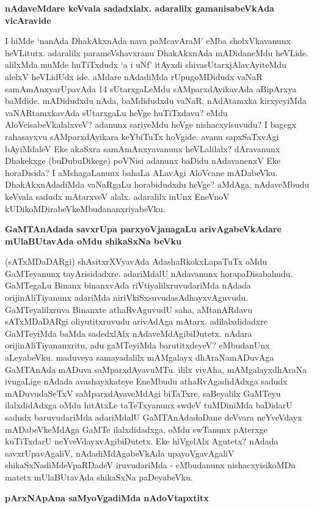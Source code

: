 {\bigskip
\noindent
{\large\bf nAdaveMdare keVvala sadadxlalx. adaralilx gamanisabeVkAda vicAravide}}\label{page169}
\medskip

\noindent
I hiMde `nanAda DhakAkxnAda nava paMcavAraM' eMba sholxVkavanunx heVLitutx. adaralilx parameVshavxranu DhakAkxnAda mADidaneMdu heVLide. alilxMda muMde huTiTxdudx `a i uNf' itAyxdi shivasUtarxjAlavAyi\-teMdu alelxV heVLidUdx ide. aMdare nAdadiMda rUpugoMDidudx vaNaR samAmAnxyarUpavAda 14 sUtarx\-gaLeMdu sAMparxdAyikavAda aBipArxya baMdide. mADidudxdu nAda, baMdidudxdu vaNaR. nAdA\-tamxka kirxyeyiMda vaNARtamxkavAda sUtarxgaLu heVge huTiTxdavu? eMdu AloVcisabeVkalalxveV? adanunx sari\-yeMdu heVge nishacxyisuvudu? I bagegx rahasayxvu sAMparxdAyikara keYbiTuTx hoVgide. avanu sapxSaTxvAgi bAyiM\-daleV Eke akaSxra samAmAnxyavanunx heVLalilalx? dAravanunx Dhakekxge (buDubuDikege) poVNisi adanunx baDidu nAdavanenxV Eke horaDisida? I aMshagaLanunx bahaLa ALavAgi AloVcane mADabeVku. DhakAkx\-nAdadiMda vaNaRgaLu horabidudxdu heVge? aMdAga, nAdaveMbudu keVvala sadudx mAtarxveV alalx. adaralilx inUnx EneVnoV kUDikoMDirabeVkeMbudananxriyabeVku.

{\bigskip
\noindent
{\large\bf GaMTAnAdada savxrUpa parxyoVjanagaLu arivAgabeVkAdare mUlaBUtavAda oMdu shikaSxNa beVku}}\label{page169}
\medskip

\noindent
(sATxMDaDARgi) shAsitxrXVyavAda AdashaRkokxLapaTuTx oMdu GaMTeyanunx tayArisi\-dadxre. adariM\-dalU nAdavanunx horapaDisabahudu. GaMTegaLu Binanx binanxvAda riVtiyalilxruvudariMda nAdada oriji\-nAliTi\-yanunx adariMda niriVkiSxsuvuda\-sAdhayxvAguvudu. GaMTeyalilxruva Binanxte athaRvAguvudU saha, aMtanARdavu sATxMDaDARgi oliyutitxruvudu arivAdAga mAtarx. adilalxdidadxre GaMTeyiMda baMda sadedxlAlx nAdaveMdAgibiDutetx. nAdara orijinAliTiyananxritu, adu gaMTeyiMda barutitxdeyeV? eMbu\-danUnx aLeyabeVku. maduveya samayadalilx mAMgalayx dhAraNamADuvAga GaMTAnAda mADuva saMparxdAyavuMTu. ililx vivAha, mAMgalayxdhAraNa ivugaLige nAdada avashayxkateye EneMbudu athaR\-vAgadidAdxga sadudx mADuvudaSeTxV saMparxdAyaveMdAgi biTaTxre, saBeyalilx GaMTeyu ilalxdidAdxga oMdu hitAtxLe taTeTxyanunx swdeV tuMDiniMda baDidarU sadudx baruvudariMda adariMdalU GaMTAnAda\-doDane deVvara neYveVdayx mADabeVkeMdAga GaMTe ilalxdidadxga, oMdu swTanunx pAterxge kuTiTxdarU neYveVdayxvAgi\-biDutetx. Eke hiVgelAlx Agutetx? nAdada savxrUpavAgaliV, nAdadiMdAgabeVkAda upayoVgavAgaliV shikaSxNa\-diMdeVpaRDadeV iruvudariMda - eMbudanunx nishacxyisikoMDu matetx mUlaBUtavAda shikaSxNa paDeyabeVku.

{\bigskip
\noindent
{\large\bf pArxNApAna saMyoVgadiMda nAdoVtapxtitx}}\label{page170}
\medskip

